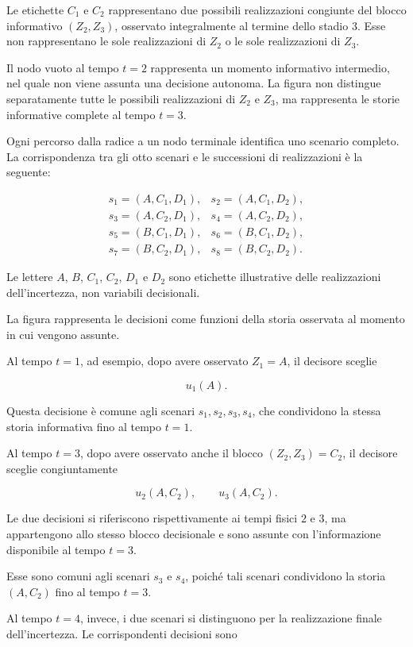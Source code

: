 Le etichette $C_1$ e $C_2$ rappresentano
due possibili realizzazioni congiunte del
blocco informativo $(Z_2,Z_3)$, osservato
integralmente al termine dello stadio 3.
Esse non rappresentano le sole realizzazioni
di $Z_2$ o le sole realizzazioni di $Z_3$.

Il nodo vuoto al tempo $t=2$ rappresenta
un momento informativo intermedio, nel quale
non viene assunta una decisione autonoma.
La figura non distingue separatamente
tutte le possibili realizzazioni di
$Z_2$ e $Z_3$, ma rappresenta le storie
informative complete al tempo $t=3$.

Ogni percorso dalla radice a un nodo
terminale identifica uno scenario completo.
La corrispondenza tra gli otto scenari
e le successioni di realizzazioni
\`{e} la seguente:

\[
\begin{array}{ll}
s_1=(A,C_1,D_1), & s_2=(A,C_1,D_2),\\
s_3=(A,C_2,D_1), & s_4=(A,C_2,D_2),\\
s_5=(B,C_1,D_1), & s_6=(B,C_1,D_2),\\
s_7=(B,C_2,D_1), & s_8=(B,C_2,D_2).
\end{array}
\]

Le lettere $A$, $B$, $C_1$, $C_2$,
$D_1$ e $D_2$ sono etichette
illustrative delle realizzazioni
dell'incertezza, non variabili
decisionali.

La figura rappresenta le decisioni
come funzioni della storia osservata
al momento in cui vengono assunte.

Al tempo $t=1$, ad esempio, dopo
avere osservato $Z_1=A$, il decisore
sceglie

\[
u_1(A).
\]

Questa decisione \`{e} comune agli
scenari $s_1,s_2,s_3,s_4$, che
condividono la stessa storia
informativa fino al tempo $t=1$.

Al tempo $t=3$, dopo avere osservato
anche il blocco $(Z_2,Z_3)=C_2$,
il decisore sceglie congiuntamente

\[
u_2(A,C_2),
\qquad
u_3(A,C_2).
\]

Le due decisioni si riferiscono
rispettivamente ai tempi fisici
$2$ e $3$, ma appartengono allo
stesso blocco decisionale e sono
assunte con l'informazione
disponibile al tempo $t=3$.

Esse sono comuni agli scenari
$s_3$ e $s_4$, poich\'{e} tali
scenari condividono la storia
$(A,C_2)$ fino al tempo $t=3$.

Al tempo $t=4$, invece, i due
scenari si distinguono per la
realizzazione finale dell'incertezza.
Le corrispondenti decisioni sono


